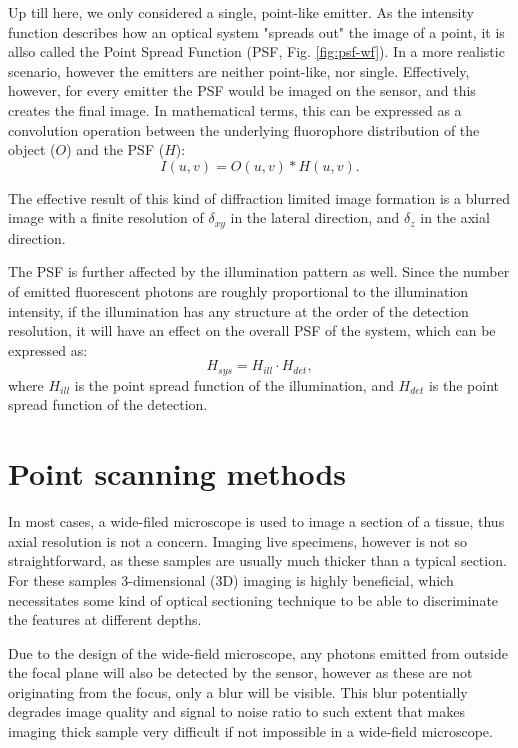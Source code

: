     Up till here, we only considered a single, point-like emitter. As the intensity function describes how an optical system "spreads out" the image of a point, it is allso called the Point Spread Function (PSF, Fig. \ref{fig:psf-wf}). In a more realistic scenario, however the emitters are neither point-like, nor single. Effectively, however, for every emitter the PSF would be imaged on the sensor, and this creates the final image. In mathematical terms, this can be expressed as a convolution operation between the underlying fluorophore distribution of the object ($O$) and the PSF ($H$):
    \begin{equation}
      I(u,v) = O(u,v) * H(u,v).
    \end{equation}

    The effective result of this kind of diffraction limited image formation is a blurred image with a finite resolution of $\delta_{xy}$ in the lateral direction, and $\delta_z$ in the axial direction.

    The PSF is further affected by the illumination pattern as well. Since the number of emitted fluorescent photons are roughly proportional to the illumination intensity, if the illumination has any structure at the order of the detection resolution, it will have an effect on the overall PSF of the system, which can be expressed as:
    \begin{equation}
      H_{sys} = H_{ill} \cdot H_{det},
      \label{eq:systemPSF}
    \end{equation}
    where $H_{ill}$ is the point spread function of the illumination, and $H_{det}$ is the point spread function of the detection.



\section{Point scanning methods}
  In most cases, a wide-filed microscope is used to image a section of a tissue, thus axial resolution is not a concern. Imaging live specimens, however is not so straightforward, as these samples are usually much thicker than a typical section. For these samples 3-dimensional (3D) imaging is highly beneficial, which necessitates some kind of optical sectioning technique to be able to discriminate the features at different depths.


  Due to the design of the wide-field microscope, any photons emitted from outside the focal plane will also be detected by the sensor, however as these are not originating from the focus, only a blur will be visible. This blur potentially degrades image quality and signal to noise ratio to such extent that makes imaging thick sample very difficult if not impossible in a wide-field microscope. 

